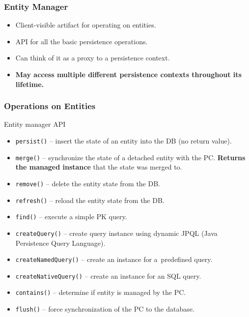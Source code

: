 \documentclass[10pt,xcolor=pdflatex]{beamer}
\begin{document}
\begin{frame}\frametitle{Entity Manager}
	\begin{itemize}
		\item Client-visible artifact for operating on entities.
        \item API for all the basic persistence operations.
		\item Can think of it as a proxy to a persistence context.
        \item \textbf{May access multiple different persistence contexts throughout its lifetime.}
	\end{itemize}
\end{frame}


\begin{frame}[fragile]\frametitle{Operations on Entities}
Entity manager API
	\begin{itemize}
        \item \verb'persist()' -- insert the state of an entity into the DB (no return value).
        \item \verb'merge()' -- synchronize the state of a detached entity with the PC. \textbf{Returns the managed instance} that the state was merged to.
        \item \verb'remove()' -- delete the entity state from the DB.
        \item \verb'refresh()' -- reload the entity state from the DB.
        \item \verb'find()' -- execute a simple PK query.
        \item \verb'createQuery()' -- create query instance using dynamic JPQL (Java Persistence Query Language).
        \item \verb'createNamedQuery()' -- create an instance for a~predefined query.
        \item \verb'createNativeQuery()' -- create an instance for an SQL query.
        \item \verb'contains()' -- determine if entity is managed by the PC.
        \item \verb'flush()' -- force synchronization of the PC to the database.
	\end{itemize}
\end{frame}
\end{document}
